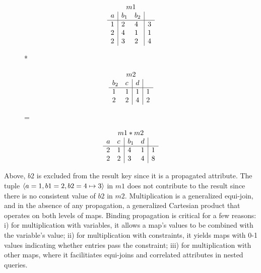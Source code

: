 \vspace{-4mm}
\begin{figure}[h]
\begin{minipage}{1in}
\[
\begin{array}{l|ll|l}
\multicolumn{4}{c}{m1}\\
 a & b_1 & b_2 & \\
\hline
 1 & 2 & 4 & 3 \\
 2 & 4 & 1 & 1 \\
 2 & 3 & 2 & 4
\end{array}
\]
\end{minipage}
*
\begin{minipage}{0.85in}
\[
\begin{array}{ll|l|l}
\multicolumn{4}{c}{m2}\\
 b_2 & c & d & \\
\hline
 1 & 1 & 1 & 1 \\
 2 & 2 & 4 & 2 \\
\end{array}
\]
\end{minipage}
=
\begin{minipage}{1in}
\[
\begin{array}{ll|ll|l}
\multicolumn{5}{c}{m1 * m2}\\
 a & c & b_1 & d & \\
\hline
 2 & 1 & 4 & 1 & 1 \\
 2 & 2 & 3 & 4 & 8 \\
\end{array}
\]
\end{minipage}
\end{figure}

\vspace{-3mm}
\noindent Above, $b2$ is excluded from the result key since it is a propagated
attribute. The tuple ${\langle a=1,b1=2,b2=4 \mapsto 3\rangle}$ in $m1$ does not
contribute to the result since there is no consistent value of $b2$ in $m2$.
Multiplication is a generalized equi-join, and in the absence of any
propagation, a generalized Cartesian product that operates on both levels of
maps.
Binding propagation is critical for a few reasons: i) for
multiplication with variables, it allows a map's values to be combined with the
variable's value; ii) for multiplication with constraints, it yields maps
with 0-1 values indicating whether entries pass the constraint; iii) for
multiplication with other maps, where it facilitiates equi-joins and correlated
attributes in nested queries.



